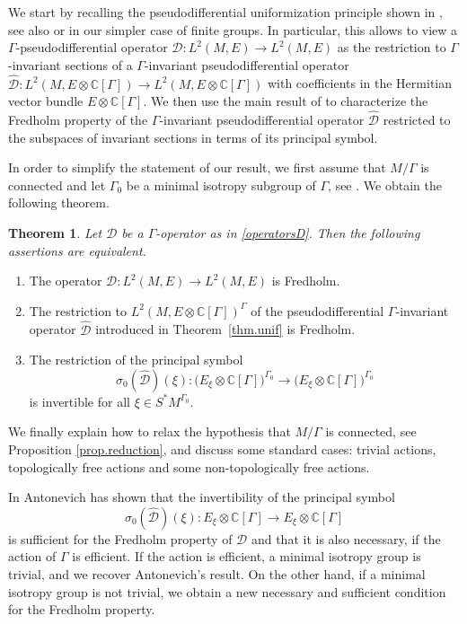 \documentclass[11pt,a4paper]{amsart}
\newcommand{\C}{\mathbb C}
\newcommand{\maD}{\mathcal D}
\newcommand\<{\langle}
\renewcommand\>{\rangle}
\theoremstyle{definition}
\newtheorem*{theorem*}{Theorem}
\begin{document}
 We start by recalling the pseudodifferential uniformization principle shown in \cite{Sternin.unif}, see also \cite{SaScSt15} or \cite{Savin.unif} in our simpler case of finite groups.
In particular, this allows to view a $\Gamma$-pseudodifferential operator 
$\maD : L^2(M,E) \rightarrow L^2(M,E)$ as the restriction to $\Gamma$-invariant sections of a $\Gamma$-invariant pseudodifferential operator $\hat{\maD} : L^2(M,E \otimes \C[\Gamma]) \rightarrow L^2(M,E \otimes \C[\Gamma])$ with coefficients in the Hermitian vector bundle $E \otimes \C[\Gamma]$. We then use the main result of \cite{BCLN2} to characterize the Fredholm property of the $\Gamma$-invariant pseudodifferential operator $\hat{\maD}$ restricted to the subspaces of invariant sections in terms of its principal symbol. 

In order to simplify the statement of our result, we first assume that $M/\Gamma$ is connected 
and let $\Gamma_0$ be a minimal isotropy subgroup of $\Gamma$, see \cite{Bredon,tomDieckTransBook}. 
%
We obtain the following theorem.


\begin{theorem*}\em
Let $\maD$ be a $\Gamma$-operator as in \eqref{operatorsD}. 
Then the following assertions are equivalent.
\begin{enumerate}\renewcommand\labelenumi{\rm(\roman{enumi})} 
\item The operator $ \maD:L^2(M,E)\to L^2(M,E)$ is Fredholm.
\item The restriction to $L^2(M,E \otimes \C[\Gamma])^{\Gamma}$ 
of the pseudodifferential $\Gamma$-invariant operator $\hat{\maD}$ introduced in Theorem~\ref{thm.unif} is Fredholm.
\item The restriction of the principal symbol
\begin{equation*}
\sigma_0(\hat{\maD})(\xi) : \big(E_\xi \otimes \C[\Gamma]\big)^{\Gamma_0} \rightarrow \big(E_\xi \otimes \C[\Gamma]\big)^{\Gamma_0} 
\end{equation*}
is invertible for all $ \xi \in S^*M^{\Gamma_0}$.
\end{enumerate} 
\end{theorem*}


We finally explain how to relax the hypothesis that $M/\Gamma$ is connected, see Proposition \ref{prop.reduction}, and discuss some standard cases:  trivial actions, topologically free actions and some non-topologically free actions. 

In  \cite[Theorem 4]{Antonevich1973} Antonevich has shown that the invertibility of the principal symbol 
\begin{equation*}
\sigma_0(\hat{\maD})(\xi) : E_\xi \otimes \C[\Gamma] \rightarrow E_\xi \otimes \C[\Gamma]  
\end{equation*}
is sufficient for the Fredholm property of $\maD$ and that it is also necessary,  if the action of $\Gamma$ is efficient. If the action is efficient, a minimal isotropy group is trivial, and we recover Antonevich's result. On the other hand, if a minimal isotropy group is not trivial, we  obtain a new necessary and sufficient condition for the Fredholm property.
\end{document}

